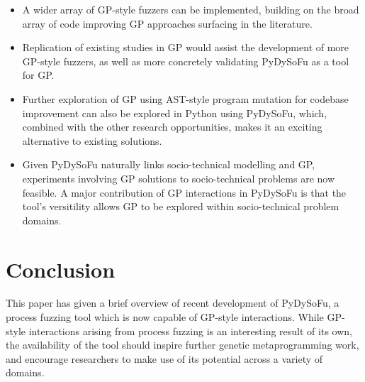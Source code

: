 \documentclass[draft,12pt]{llncs} %
\begin{document}
\begin{itemize}

\item A wider array of GP-style fuzzers can be implemented, building on the
  broad array of code improving GP approaches surfacing in the literature.

\item Replication of existing studies in GP would assist the development of more
GP-style fuzzers, as well as more concretely validating PyDySoFu as a tool for
GP.

\item Further exploration of GP using AST-style program mutation for codebase
  improvement can also be explored in Python using PyDySoFu, which, combined
  with the other research opportunities, makes it an exciting alternative to
  existing solutions.

\item Given PyDySoFu naturally links socio-technical modelling and GP,
  experiments involving GP solutions to socio-technical problems are now
  feasible. A major contribution of GP interactions in PyDySoFu is that the
  tool's versitility allows GP to be explored within socio-technical problem
  domains\cite{wallis2018a}.

\end{itemize}


\section{Conclusion}
This paper has given a brief overview of recent development of PyDySoFu, a
process fuzzing tool which is now capable of GP-style interactions. While
GP-style interactions arising from process fuzzing is an interesting result of
its own, the availability of the tool should inspire further genetic
metaprogramming work, and encourage researchers to make use of its
potential across a variety of domains.\par



\end{document}
